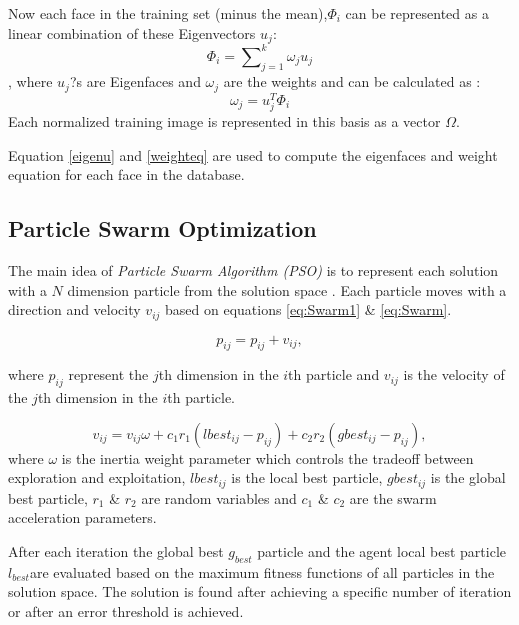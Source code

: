 \documentclass[a4paper,twoside]{article}
\begin{document}
\begin{enumerate}
Now each face in the training set (minus the mean),$\Phi_i$  can be represented as a linear combination of these Eigenvectors   $u_j$:
  \begin{equation}
\label{eqphi}
\Phi_i  = \sum\nolimits_{j = 1}^k {\omega_j u_j}
  \end{equation}
, where  $u_j$?s are Eigenfaces and $\omega_j$ are the weights and can be calculated as :
\begin{equation}
\label{weighteq}
\omega _j  = u_j^T \Phi _i
\end{equation}
Each normalized training image is represented in this basis as a vector $\Omega$.
\end{enumerate}

Equation \ref{eigenu} and \ref{weighteq} are used to compute the eigenfaces and weight equation for each face in the database.
\subsection{Particle Swarm Optimization}
\label{sec:ParticleSwarmAlgorithm}
 The main idea of \textit{Particle Swarm Algorithm (PSO)} is to represent each solution with a $N$ dimension particle from the solution space \cite{PSOFirst}. Each particle moves with a direction and velocity $v_{ij}$ based on equations \ref{eq:Swarm1} \& \ref{eq:Swarm}.

\begin{equation}
p_{ij}=p_{ij}+v_{ij},
\label{eq:Swarm1}
\end{equation}

where $p_{ij}$ represent the $j$th dimension in the $i$th particle and $v_{ij}$ is the velocity of the $j$th dimension in the $i$th particle.

 \begin{equation}
v_{ij}  = v_{ij} \omega + c_1 r_1 (lbest_{ij}  - p_{ij} ) + c_2 r_2 (gbest_{ij}  - p_{ij} ),
\label{eq:Swarm}
\end{equation}
 where $\omega$ is the inertia weight parameter which controls the tradeoff between exploration and exploitation,  $lbest_{ij}$ is the local best particle, $gbest_{ij}$ is the global best particle, $r_1$ \& $r_2$ are random variables and $c_1$ \& $c_2$ are the swarm acceleration parameters.

 After each iteration the global best $g_{best}$ particle and the agent local best particle $l_{best}$are evaluated based on the maximum fitness functions of all particles in the solution space. The solution is found after achieving a specific number of iteration or after an error threshold is achieved.
\end{document}
